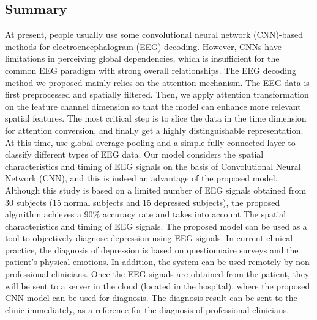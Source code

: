 \documentclass[a0,portrait]{a0poster}
\begin{document}
\begin{minipage}[c]{\linewidth}
\begin{framed}
\begin{multicols}{2}
\section*{Summary}
At present, people usually use some convolutional neural network (CNN)-based methods for electroencephalogram (EEG) decoding. However, CNNs have limitations in perceiving global dependencies, which is insufficient for the common EEG paradigm with strong overall relationships. The EEG decoding method we proposed mainly relies on the attention mechanism. The EEG data is first preprocessed and spatially filtered. Then, we apply attention transformation on the feature channel dimension so that the model can enhance more relevant spatial features. The most critical step is to slice the data in the time dimension for attention conversion, and finally get a highly distinguishable representation. At this time, use global average pooling and a simple fully connected layer to classify different types of EEG data. Our model considers the spatial characteristics and timing of EEG signals on the basis of Convolutional Neural Network (CNN), and this is indeed an advantage of the proposed model.
   Although this study is based on a limited number of EEG signals obtained from 30 subjects (15 normal subjects and 15 depressed subjects), the proposed algorithm achieves a 90\% accuracy rate and takes into account The spatial characteristics and timing of EEG signals. The proposed model can be used as a tool to objectively diagnose depression using EEG signals. In current clinical practice, the diagnosis of depression is based on questionnaire surveys and the patient's physical emotions. In addition, the system can be used remotely by non-professional clinicians. Once the EEG signals are obtained from the patient, they will be sent to a server in the cloud (located in the hospital), where the proposed CNN model can be used for diagnosis. The diagnosis result can be sent to the clinic immediately, as a reference for the diagnosis of professional clinicians.\\


\end{multicols}
\end{framed}
\end{minipage}
\end{document}

